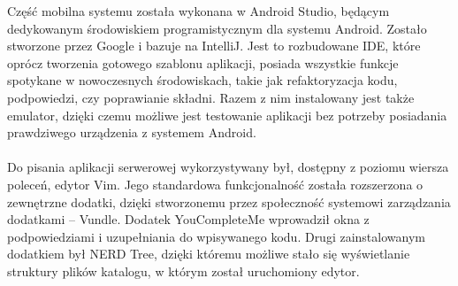 Część mobilna systemu została wykonana w Android Studio, będącym dedykowanym środowiskiem programistycznym dla systemu Android. Zostało stworzone przez Google i bazuje na IntelliJ. Jest to rozbudowane IDE, które oprócz tworzenia gotowego szablonu aplikacji, posiada wszystkie funkcje spotykane w nowoczesnych środowiskach, takie jak refaktoryzacja kodu, podpowiedzi, czy poprawianie składni. Razem z nim instalowany jest także emulator, dzięki czemu możliwe jest testowanie aplikacji bez potrzeby posiadania prawdziwego urządzenia z systemem Android.
\\
\\
Do pisania aplikacji serwerowej wykorzystywany był, dostępny z poziomu wiersza poleceń, edytor Vim. Jego standardowa funkcjonalność została rozszerzona o zewnętrzne dodatki, dzięki stworzonemu przez społeczność systemowi zarządzania dodatkami -- Vundle. Dodatek YouCompleteMe wprowadził okna z podpowiedziami i uzupełniania do wpisywanego kodu. Drugi zainstalowanym dodatkiem był NERD Tree, dzięki któremu możliwe stało się wyświetlanie struktury plików katalogu, w którym został uruchomiony edytor.